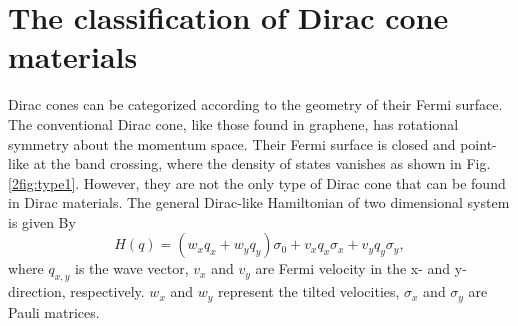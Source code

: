 \section{The classification of Dirac cone materials} \label{2sec: Dirac cone class}
    Dirac cones can be categorized according to the geometry of their Fermi surface.
    The conventional Dirac cone, like those found in graphene, has rotational symmetry about the momentum space. 
    Their Fermi surface is closed and point-like at the band crossing, where the density of states vanishes as shown in Fig. \ref{2fig:type1}.
    However, they are not the only type of Dirac cone that can be found in Dirac materials.
    The general Dirac-like Hamiltonian of two dimensional system is given By
    \begin{equation} \label{2eq:Hamiltonian in dirac cone class}
        H(q) = (w_{x}q_x+w_{y}q_y)\sigma_0 + v_x q_x \sigma_x + v_y q_y \sigma_y,
    \end{equation}
    where $q_{x,y}$ is the wave vector, $v_{x}$ and $v_{y}$ are Fermi velocity in the x- and y-direction, respectively. 
    $w_{x}$ and $w_{y}$ represent the tilted velocities, $\sigma_x$ and $\sigma_y$ are Pauli matrices.
